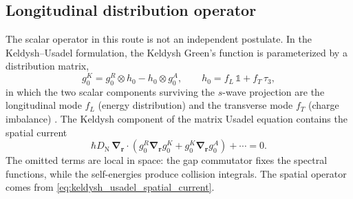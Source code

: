 \documentclass[
  aps,
  prb,
  preprint,
  superscriptaddress,
  longbibliography,
  nofootinbib
]{revtex4-2}
\newcommand{\br}{\mathbf{r}}
\newcommand{\bnabla}{\boldsymbol{\nabla}}
\newcommand{\DN}{D_{\mathrm{N}}}
\newcommand{\fL}{f_L}
\newcommand{\fT}{f_T}
\providecommand{\openone}{}\renewcommand{\openone}{\mathds{1}}
\begin{document}
\subsection{Longitudinal distribution operator}
\label{sec:usadel_longitudinal}

The scalar operator in this route is not an independent postulate. In the
Keldysh--Usadel formulation, the Keldysh Green's function is parameterized by
a distribution matrix,
\begin{equation}
  g_0^K
  =
  g_0^R\otimes h_0
  -
  h_0\otimes g_0^A,
  \qquad
  h_0
  =
  \fL\,\openone
  +
  \fT\,\tau_3,
  \label{eq:gK_distribution_parameterization}
\end{equation}
in which the two scalar components surviving the \(s\)-wave projection are the
longitudinal mode \(\fL\) (energy distribution) and the transverse mode
\(\fT\) (charge imbalance) \cite{kopnin2001}. The Keldysh component of the
matrix Usadel equation contains the spatial current
\begin{equation}
  \hbar\DN\,
  \bnabla_{\br}\cdot
  \left(
    g_0^R\bnabla_{\br}g_0^K
    +
    g_0^K\bnabla_{\br}g_0^A
  \right)
  + \cdots =0 .
  \label{eq:keldysh_usadel_spatial_current}
\end{equation}
The omitted terms are local in space: the gap commutator fixes the spectral
functions, while the self-energies produce collision integrals. The spatial
operator comes from \cref{eq:keldysh_usadel_spatial_current}.
\end{document}
